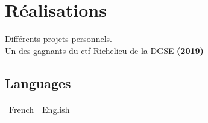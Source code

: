 \documentclass[a4paper,10pt]{article}
\begin{document}
\begin{adjustbox}{valign=t}
\begin{minipage}{0.6\textwidth}





\section*{Réalisations}
\begin{spacing}{1.0}
    \raggedright
    Différents projets personnels.\\
    Un des gagnants du ctf Richelieu de la DGSE \textbf{(2019)}
\end{spacing}
\vspace{-1.0mm}

\setlength{\columnsep}{-2cm}
\begin{multicols}{2}

\section*{Languages}
\begin{tabular}{ll}
    French & 
    English & 
\end{tabular}


\end{multicols}
\end{minipage}
\end{adjustbox}
\end{document}
